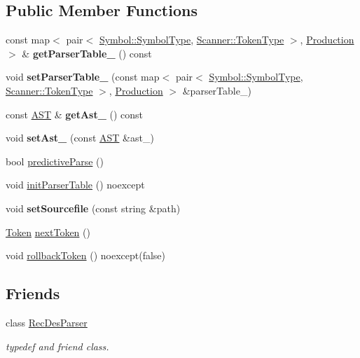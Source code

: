 \subsection*{Public Member Functions}
\begin{DoxyCompactItemize}
\item 
\hypertarget{class_parser_a5bf0b31b43b25b002ff36068fd858f09}{}\label{class_parser_a5bf0b31b43b25b002ff36068fd858f09} 
const map$<$ pair$<$ \hyperlink{class_symbol_a7ee37d4cfcb980f4eddf7ed1a028da5a}{Symbol\+::\+Symbol\+Type}, \hyperlink{class_scanner_a1d588ca5cfd26bdff0e59b437da5b166}{Scanner\+::\+Token\+Type} $>$, \hyperlink{class_production}{Production} $>$ \& {\bfseries get\+Parser\+Table\+\_\+} () const
\item 
\hypertarget{class_parser_ae0884868884dceef40f1779a72c2e1ab}{}\label{class_parser_ae0884868884dceef40f1779a72c2e1ab} 
void {\bfseries set\+Parser\+Table\+\_\+} (const map$<$ pair$<$ \hyperlink{class_symbol_a7ee37d4cfcb980f4eddf7ed1a028da5a}{Symbol\+::\+Symbol\+Type}, \hyperlink{class_scanner_a1d588ca5cfd26bdff0e59b437da5b166}{Scanner\+::\+Token\+Type} $>$, \hyperlink{class_production}{Production} $>$ \&parser\+Table\+\_\+)
\item 
\hypertarget{class_parser_a3d06871335cd2ad61bcc7a97d969ad5c}{}\label{class_parser_a3d06871335cd2ad61bcc7a97d969ad5c} 
const \hyperlink{class_a_s_t}{A\+ST} \& {\bfseries get\+Ast\+\_\+} () const
\item 
\hypertarget{class_parser_aabf369c39918a49281118055edec57ba}{}\label{class_parser_aabf369c39918a49281118055edec57ba} 
void {\bfseries set\+Ast\+\_\+} (const \hyperlink{class_a_s_t}{A\+ST} \&ast\+\_\+)
\item 
bool \hyperlink{class_parser_a69a4eff828356f0c9cbf94f904ef596f}{predictive\+Parse} ()
\item 
void \hyperlink{class_parser_a49977242eb4dcb3ce4909d5ffbe2a813}{init\+Parser\+Table} () noexcept
\item 
\hypertarget{class_parser_af24611cf6bd9f345ce8bcc667d2220e8}{}\label{class_parser_af24611cf6bd9f345ce8bcc667d2220e8} 
void {\bfseries set\+Sourcefile} (const string \&path)
\item 
\hyperlink{struct_scanner_1_1_token}{Token} \hyperlink{class_parser_aadd9e6622f688ed2e64c0d9d1343af9c}{next\+Token} ()
\item 
void \hyperlink{class_parser_aba97a915de87d7df659a484cf8b196d8}{rollback\+Token} () noexcept(false)
\end{DoxyCompactItemize}
\subsection*{Friends}
\begin{DoxyCompactItemize}
\item 
class \hyperlink{class_parser_a2b52de0ab06881c5f9906812aaaca3cb}{Rec\+Des\+Parser}
\begin{DoxyCompactList}\small\item\em typedef and friend class. \end{DoxyCompactList}\end{DoxyCompactItemize}


